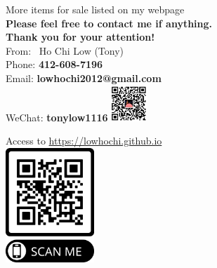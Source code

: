 \documentclass{article}[12pt]
\begin{document}
{\begin{minipage}[t][\textheight-27pt][t]{445pt}
\begin{minipage}[b]{0.5\textwidth}
{\color{red}\sc More items for sale listed on my webpage}\\
{\bf Please feel free to contact me if anything.}\\
{\bf Thank you for your attention!}\\
From: \, Ho Chi Low (Tony)\\
Phone: {\bf412-608-7196} \\
Email: {\bf lowhochi2012@gmail.com} \\
WeChat: {\bf tonylow1116} \quad \includegraphics[width=0.1\textwidth]{wechat_QRcode.png}
\end{minipage} 
\begin{minipage}[b]{0.5\textwidth}
\begin{center}
Access to \href{https://lowhochi.github.io}{\url{https://lowhochi.github.io}}\\[5pt]
\includegraphics[width=0.25\textwidth]{qr2web.png}
\end{center}
\end{minipage}
%
\end{minipage}}
\end{document}

